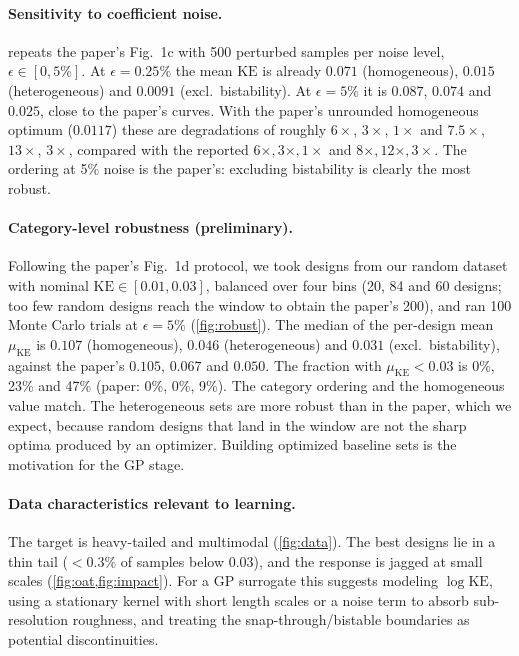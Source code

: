 \documentclass[12pt,letterpaper]{article}
\newcommand{\KE}{\mathrm{KE}}
\begin{document}
\paragraph{Sensitivity to coefficient noise.}
 repeats the paper's Fig.~1c with 500 perturbed samples per noise
level, $\epsilon\in[0,5\%]$. At $\epsilon=0.25\%$ the mean $\KE$ is already
$0.071$ (homogeneous), $0.015$ (heterogeneous) and $0.0091$ (excl.\ bistability). At
$\epsilon=5\%$ it is $0.087$, $0.074$ and $0.025$, close to the paper's curves. With
the paper's unrounded homogeneous optimum ($0.0117$) these are degradations of roughly
$6\times$, $3\times$, $1\times$ and $7.5\times$, $13\times$, $3\times$, compared with the
reported $6\times,3\times,1\times$ and $8\times,12\times,3\times$. The ordering at 5\%
noise is the paper's: excluding bistability is clearly the most robust.

\paragraph{Category-level robustness (preliminary).}
Following the paper's Fig.~1d protocol, we took designs from our random dataset with
nominal $\KE\in[0.01,0.03]$, balanced over four bins (20, 84 and 60 designs; too few
random designs reach the window to obtain the paper's 200), and ran 100 Monte Carlo
trials at $\epsilon=5\%$ (\cref{fig:robust}). The median of the per-design mean
$\mu_\KE$ is $0.107$ (homogeneous), $0.046$ (heterogeneous) and $0.031$ (excl.\
bistability), against the paper's $0.105$, $0.067$ and $0.050$. The fraction with
$\mu_\KE<0.03$ is 0\%, 23\% and 47\% (paper: 0\%, 0\%, 9\%). The category ordering and
the homogeneous value match. The heterogeneous sets are more robust than in the paper,
which we expect, because random designs that land in the window are not the sharp
optima produced by an optimizer. Building optimized baseline sets is the motivation for
the GP stage.

\paragraph{Data characteristics relevant to learning.}
The target is heavy-tailed and multimodal (\cref{fig:data}). The best designs lie in a
thin tail ($<0.3\%$ of samples below $0.03$), and the response is jagged at small scales
(\cref{fig:oat,fig:impact}). For a GP surrogate this suggests modeling $\log\KE$, using
a stationary kernel with short length scales or a noise term to absorb sub-resolution
roughness, and treating the snap-through/bistable boundaries as potential
discontinuities.
\end{document}

